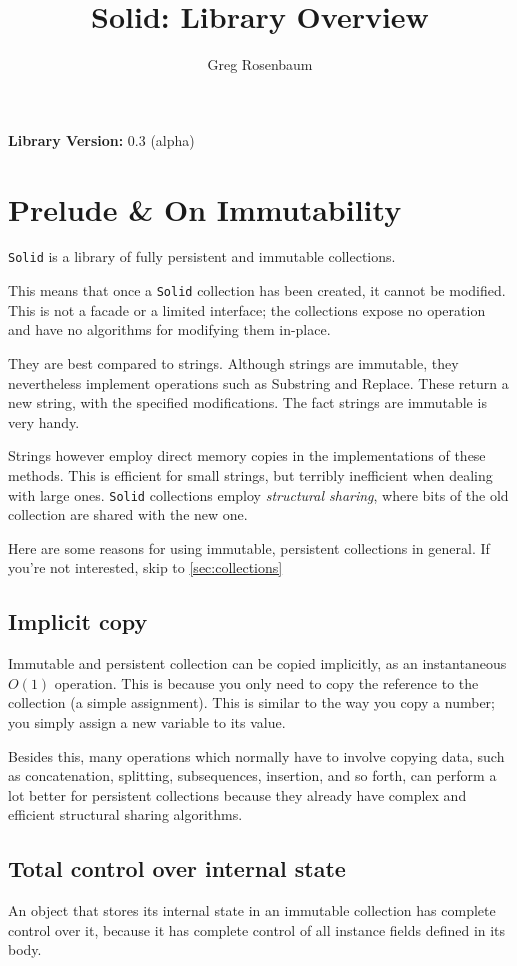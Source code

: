 \documentclass[]{article}
\title{Solid: Library Overview}
\author{Greg Rosenbaum}
\newcommand{\codeformat}{\ttfamily}
\newcommand{\methodformat}{\codeformat\color{MidnightBlue}}
\newcommand{\method}[1]{{\methodformat #1}}
\newcommand{\solid}{\texttt{Solid}\xspace}
\newcommand{\version}{0.3 (alpha)}
\newcommand{\makeversion} %
	{
		\centerline{\textbf{Library Version: } \version}
	}
\begin{document}
\maketitle
\makeversion

\tableofcontents


\section{Prelude \& On Immutability}
\solid is a library of fully persistent and immutable collections. 

This means that once a \solid collection has been created, it cannot be modified. This is not a facade or a limited interface; the collections expose no operation and have no algorithms for modifying them in-place. 

They are best compared to strings. Although strings are immutable, they nevertheless implement operations such as \method{Substring} and \method{Replace}. These return a new string, with the specified modifications. The fact strings are immutable is very handy.

Strings however employ direct memory copies in the implementations of these methods. This is efficient for small strings, but terribly inefficient when dealing with large ones. \solid collections employ \emph{structural sharing}, where bits of the old collection are shared with the new one. 

Here are some reasons for using immutable, persistent collections in general. If you're not interested, skip to \cref{sec:collections}


\subsection{Implicit copy}
Immutable and persistent collection can be copied implicitly, as an instantaneous $O(1)$ operation. This is because you only need to copy the reference to the collection (a simple assignment). This is similar to the way you copy a number; you simply assign a new variable to its value.

Besides this, many operations which normally have to involve copying data, such as concatenation, splitting, subsequences, insertion, and so forth, can perform a lot better for persistent collections because they already have complex and efficient structural sharing algorithms.

\subsection{Total control over internal state}
An object that stores its internal state in an immutable collection has complete control over it, because it has complete control of all instance fields defined in its body. 
\end{document}
